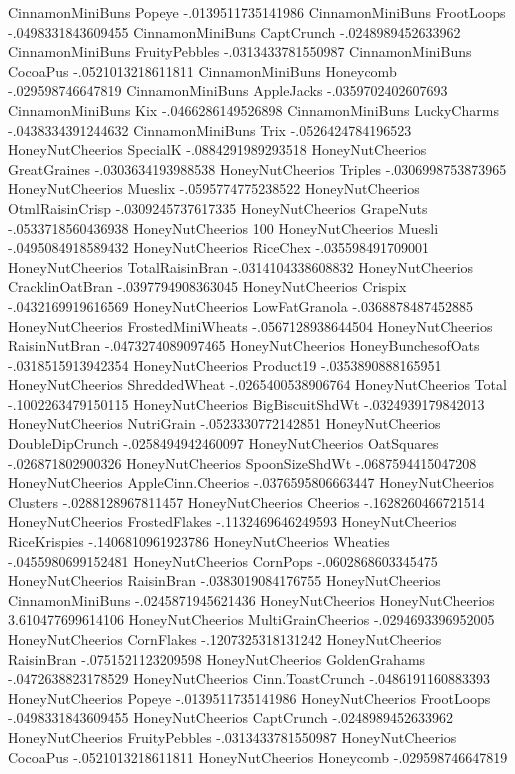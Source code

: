 CinnamonMiniBuns	Popeye	-.0139511735141986
CinnamonMiniBuns	FrootLoops	-.0498331843609455
CinnamonMiniBuns	CaptCrunch	-.0248989452633962
CinnamonMiniBuns	FruityPebbles	-.0313433781550987
CinnamonMiniBuns	CocoaPus	-.0521013218611811
CinnamonMiniBuns	Honeycomb	-.029598746647819
CinnamonMiniBuns	AppleJacks	-.0359702402607693
CinnamonMiniBuns	Kix	-.0466286149526898
CinnamonMiniBuns	LuckyCharms	-.0438334391244632
CinnamonMiniBuns	Trix	-.0526424784196523
HoneyNutCheerios	SpecialK	-.0884291989293518
HoneyNutCheerios	GreatGraines	-.0303634193988538
HoneyNutCheerios	Triples	-.0306998753873965
HoneyNutCheerios	Mueslix	-.0595774775238522
HoneyNutCheerios	OtmlRaisinCrisp	-.0309245737617335
HoneyNutCheerios	GrapeNuts	-.0533718560436938
HoneyNutCheerios	100%
HoneyNutCheerios	Muesli	-.0495084918589432
HoneyNutCheerios	RiceChex	-.035598491709001
HoneyNutCheerios	TotalRaisinBran	-.0314104338608832
HoneyNutCheerios	CracklinOatBran	-.0397794908363045
HoneyNutCheerios	Crispix	-.0432169919616569
HoneyNutCheerios	LowFatGranola	-.0368878487452885
HoneyNutCheerios	FrostedMiniWheats	-.0567128938644504
HoneyNutCheerios	RaisinNutBran	-.0473274089097465
HoneyNutCheerios	HoneyBunchesofOats	-.0318515913942354
HoneyNutCheerios	Product19	-.0353890888165951
HoneyNutCheerios	ShreddedWheat	-.0265400538906764
HoneyNutCheerios	Total	-.1002263479150115
HoneyNutCheerios	BigBiscuitShdWt	-.0324939179842013
HoneyNutCheerios	NutriGrain	-.0523330772142851
HoneyNutCheerios	DoubleDipCrunch	-.0258494942460097
HoneyNutCheerios	OatSquares	-.026871802900326
HoneyNutCheerios	SpoonSizeShdWt	-.0687594415047208
HoneyNutCheerios	AppleCinn.Cheerios	-.0376595806663447
HoneyNutCheerios	Clusters	-.0288128967811457
HoneyNutCheerios	Cheerios	-.1628260466721514
HoneyNutCheerios	FrostedFlakes	-.1132469646249593
HoneyNutCheerios	RiceKrispies	-.1406810961923786
HoneyNutCheerios	Wheaties	-.0455980699152481
HoneyNutCheerios	CornPops	-.0602868603345475
HoneyNutCheerios	RaisinBran	-.0383019084176755
HoneyNutCheerios	CinnamonMiniBuns	-.0245871945621436
HoneyNutCheerios	HoneyNutCheerios	3.610477699614106
HoneyNutCheerios	MultiGrainCheerios	-.0294693396952005
HoneyNutCheerios	CornFlakes	-.1207325318131242
HoneyNutCheerios	RaisinBran	-.0751521123209598
HoneyNutCheerios	GoldenGrahams	-.0472638823178529
HoneyNutCheerios	Cinn.ToastCrunch	-.0486191160883393
HoneyNutCheerios	Popeye	-.0139511735141986
HoneyNutCheerios	FrootLoops	-.0498331843609455
HoneyNutCheerios	CaptCrunch	-.0248989452633962
HoneyNutCheerios	FruityPebbles	-.0313433781550987
HoneyNutCheerios	CocoaPus	-.0521013218611811
HoneyNutCheerios	Honeycomb	-.029598746647819
